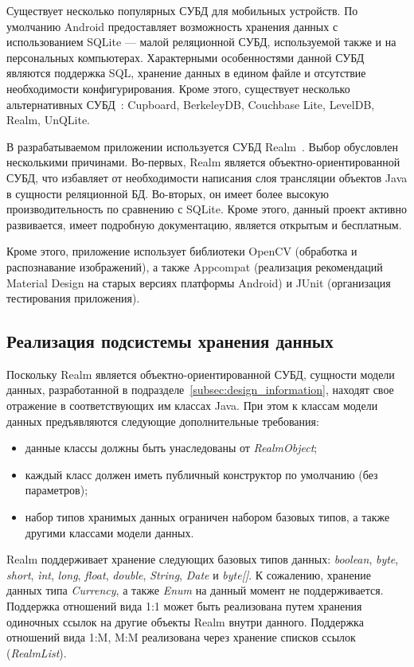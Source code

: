 Существует несколько популярных СУБД для мобильных устройств.
По умолчанию Android предоставляет возможность хранения
данных с использованием SQLite --- малой реляционной СУБД,
используемой также и на персональных компьютерах.
Характерными особенностями данной СУБД являются поддержка SQL,
хранение данных в едином файле и отсутствие необходимости конфигурирования.
Кроме этого, существует несколько альтернативных СУБД~\cite{mobile_db}:
Cupboard, BerkeleyDB, Couchbase Lite, LevelDB, Realm, UnQLite.

В разрабатываемом приложении используется СУБД Realm~\cite{realm_official}.
Выбор обусловлен несколькими причинами.
Во-первых, Realm является объектно-ориентированной СУБД,
что избавляет от необходимости написания слоя трансляции объектов Java
в сущности реляционной БД.
Во-вторых, он имеет более высокую производительность по сравнению с SQLite.
Кроме этого, данный проект активно развивается, имеет подробную документацию,
является открытым и бесплатным.

Кроме этого, приложение использует библиотеки OpenCV
(обработка и распознавание изображений),
а также Appcompat (реализация рекомендаций Material Design на старых версиях платформы Android)
и JUnit (организация тестирования приложения).

\subsection{Реализация подсистемы хранения данных}
\label{subsec:implementation_db}

Поскольку Realm является объектно-ориентированной СУБД,
сущности модели данных, разработанной в подразделе~\ref{subsec:design_information},
находят свое отражение в соответствующих им классах Java.
При этом к классам модели данных предъявляются следующие дополнительные требования:
\begin{itemize}
  \item данные классы должны быть унаследованы от \textit{RealmObject};
  \item каждый класс должен иметь публичный конструктор по умолчанию (без параметров);
  \item набор типов хранимых данных ограничен набором базовых типов,
    а также другими классами модели данных.
\end{itemize}

Realm поддерживает хранение следующих базовых типов данных:
\textit{boolean}, \textit{byte}, \textit{short}, \textit{ìnt},
\textit{long}, \textit{float}, \textit{double}, \textit{String},
\textit{Date} и \textit{byte[]}.
К сожалению, хранение данных типа \textit{Currency}, а также
\textit{Enum} на данный момент не поддерживается.
Поддержка отношений вида 1:1 может быть реализована
путем хранения одиночных ссылок на другие объекты Realm внутри данного.
Поддержка отношений вида 1:M, M:M
реализована через хранение списков ссылок (\textit{RealmList}).


